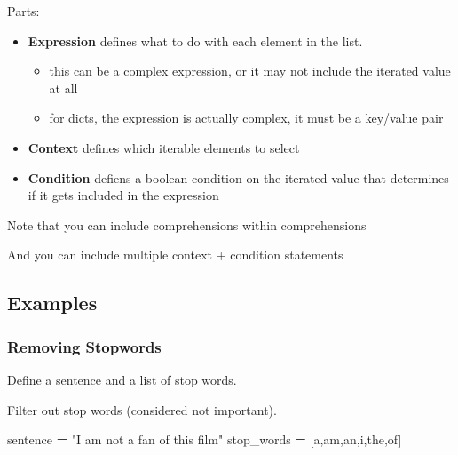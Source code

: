 \documentclass[
]{book}
\newenvironment{Shaded}{\begin{snugshade}}{\end{snugshade}}
\newcommand{\NormalTok}[1]{#1}
\newcommand{\OperatorTok}[1]{\textcolor[rgb]{0.81,0.36,0.00}{\textbf{#1}}}
\newcommand{\StringTok}[1]{\textcolor[rgb]{0.31,0.60,0.02}{#1}}
\providecommand{\tightlist}{%
  \setlength{\itemsep}{0pt}\setlength{\parskip}{0pt}}
\begin{document}
Parts:

\begin{itemize}
\item
  \textbf{Expression} defines what to do with each element in the list.

  \begin{itemize}
  \tightlist
  \item
    this can be a complex expression, or it may not include the iterated value at all
  \item
    for dicts, the expression is actually complex, it must be a key/value pair
  \end{itemize}
\item
  \textbf{Context} defines which iterable elements to select
\item
  \textbf{Condition} defiens a boolean condition on the iterated value that determines if it gets included in the expression
\end{itemize}

Note that you can include comprehensions within comprehensions

And you can include multiple context + condition statements

\subsection{Examples}\label{examples}

\subsubsection{Removing Stopwords}\label{removing-stopwords}

Define a sentence and a list of stop words.

Filter out stop words (considered not important).

\begin{Shaded}
\begin{Highlighting}[]
\NormalTok{sentence }\OperatorTok{=} \StringTok{"I am not a fan of this film"}
\NormalTok{stop\_words }\OperatorTok{=}\NormalTok{ [}\StringTok{\textquotesingle{}a\textquotesingle{}}\NormalTok{,}\StringTok{\textquotesingle{}am\textquotesingle{}}\NormalTok{,}\StringTok{\textquotesingle{}an\textquotesingle{}}\NormalTok{,}\StringTok{\textquotesingle{}i\textquotesingle{}}\NormalTok{,}\StringTok{\textquotesingle{}the\textquotesingle{}}\NormalTok{,}\StringTok{\textquotesingle{}of\textquotesingle{}}\NormalTok{]}
\end{Highlighting}
\end{Shaded}
\end{document}

